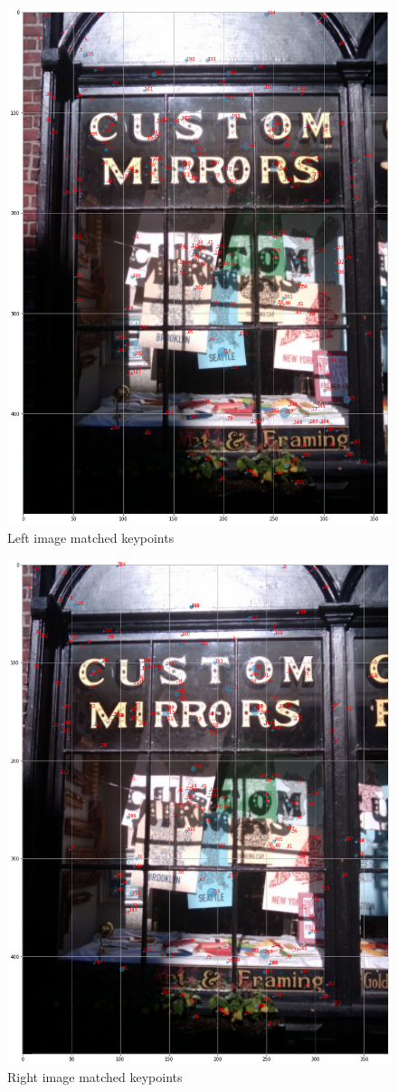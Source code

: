 \documentclass[]{article}
\begin{document}
\begin{figure}[htb]
	\centering
	\includegraphics[width=\linewidth]{CustomMirrorsLeftStep4}
	\caption{Left image matched keypoints}
	\label{custommirrorsleftstep4}
\end{figure}
\begin{figure}[htb]
	\centering
	\includegraphics[width=\linewidth]{CustomMirrorsRightStep4}
	\caption{Right image matched keypoints}
	\label{custommirrorsrightstep4}
\end{figure}
\end{document}
